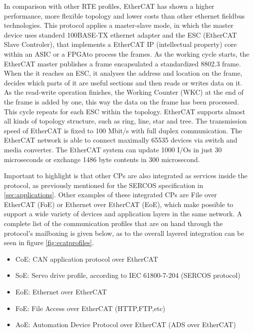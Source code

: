 In comparison with other RTE profiles, EtherCAT has shown a higher performance, more flexible topology and lower costs than other ethernet fieldbus 
technologies. This  protocol  applies  a  master-slave  mode,  in  which  the  master  
device  uses  standerd  100BASE-TX  ethernet  adapter  and  the  ESC  (EtherCAT  Slave  Controler), that implements a EtherCAT IP 
(intellectual property) core within an ASIC or a FPGAto process the frames. As  the  working  cycle starts, the  EtherCAT master  
publishes a frame encapsulated a standardized 8802.3 frame. When the it reaches an ESC, it analyses the address and location on the frame, decides
which parts of it are useful sections and then reads or writes data on it. As the
read-write operation finishes, the Working Counter (WKC) at the end of the frame is added by one, this way the data on the frame has been processed. 
This cycle repeats for each ESC within the topology.%
EtherCAT supports almost all kinds of topology structure, such as ring, line, star and tree. The transmission speed of  EtherCAT  is  fixed  to  100  
Mbit/s  with  full  duplex  communication.  The  EtherCAT  network  is  able  to  connect  maximally 65535  devices  via  switch  and  media  converter.  
The  EtherCAT  system  can  update  1000  I/Os  in  just  30  microseconds  or  exchange  1486  byte  contents  in  300  microsecond. \cite{beckhoff_datasheet}\cite{ecat_sercos}  %

Important to highlight is that other CPs are also integrated as services inside the protocol, as previously mentioned for 
the SERCOS specification in \ref{sec:applications}. 
Other examples of these integrated CPs are File over EtherCAT (FoE) or Ethernet over EtherCAT (EoE), which
make possible to support a wide variety of devices and application layers in the same network\cite{beckhoff_compatibility}. %
A complete list of the communication profiles that are on hand
through the protocol's mailboxing is given below, as to the overall layered integration can be seen in figure \ref{fig:ecatprofiles}.
\begin{itemize}
    \item CoE: CAN application protocol over EtherCAT
    \item SoE: Servo drive profile, according to IEC 61800-7-204 (SERCOS protocol)
    \item EoE: Ethernet over EtherCAT
    \item FoE: File Access over EtherCAT (HTTP,FTP,etc)
    \item AoE: Automation Device Protocol over EtherCAT (ADS over EtherCAT)
\end{itemize}

